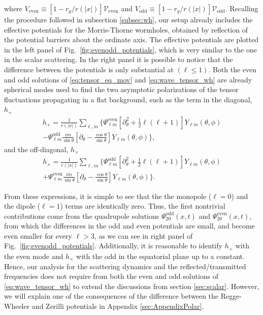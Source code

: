 \documentclass[article,aps,nofootinbib,twocolumn,superscriptaddress]{revtex4-1}
\begin{document}
where $V_{\mathrm{even}}\equiv[1-r_g/r(|x|)]\mathcal{V}_{\mathrm{even}}$ and $V_{\mathrm{odd}}\equiv[1-r_g/r(|x|)]\mathcal{V}_{\mathrm{odd}}$. Recalling the procedure followed in subsection \ref{subsec:wh}, our setup already includes the effective potentials for the Morris-Thorne wormholes, obtained by reflection of the potential barriers about the ordinate axis. The effective potentials are plotted in the left panel of Fig.~\ref{fig:evenodd_potentials}, which is very similar to the one in the scalar scattering. In the right panel it is possible to notice that the difference between the potentials is only substantial at $(\ell\leq1)$. Both the even and odd solutions of \eqref{eq:tensor_eq_mov} and \eqref{eq:wave_tensor_wh} are already spherical modes used to find the two asymptotic polarizations of the tensor fluctuations propagating in a flat background, such as the term in the diagonal, $h_+$ 
\begin{align}
\displaystyle{h_+=\frac{1}{r(|x|)}\sum_{\ell,m}\bigg\{\Psi_{\ell m}^{\mathrm{even}}\left[\partial^2_{\theta}+\frac{1}{2}\ell(\ell+1)\right]Y_{\ell m}(\theta,\phi)}\nonumber\\
\displaystyle{-\Psi_{\ell m}^{\mathrm{odd}}\frac{i m}{\sin\theta}\left[\partial_{\theta}-\frac{\cos\theta}{\sin\theta}\right]Y_{\ell m}(\theta,\phi)\bigg\}},
\label{eq:hplus}
\end{align} 
and the off-diagonal, $h_{\times}$ 
\begin{align}
\displaystyle{h_{\times}=\frac{1}{r(|x|)}\sum_{\ell,m}\bigg\{\Psi_{\ell m}^{\mathrm{odd}}\left[\partial^2_{\theta}+\frac{1}{2}\ell(\ell+1)\right]Y_{\ell m}(\theta,\phi)}\nonumber\\
\displaystyle{+\Psi_{\ell m}^{\mathrm{even}}\frac{i m}{\sin\theta}\left[\partial_{\theta}-\frac{\cos\theta}{\sin\theta}\right]Y_{\ell m}(\theta,\phi)\bigg\}}.
\label{eq:hx}
\end{align}


From these expressions, it is simple to see that the the monopole ($\ell=0$) and the dipole ($\ell=1$) terms are identically zero. Thus, the first nontrivial contributions come from the quadrupole solutions $\Psi_{20}^{\mathrm{odd}}(x,t)$ and $\Psi_{20}^{\mathrm{even}}(x,t)$, from which the differences in the odd and even potentials are small, and become even smaller for every $\ell>3$, as we can see in right panel of Fig.~\ref{fig:evenodd_potentials}. Additionally, it is reasonable to identify $h_+$ with the even mode and  $h_{\times}$ with the odd in the equatorial plane up to a constant. Hence, our analysis for the scattering dynamics and the reflected/transmitted frequencies does not require from both the even and odd solutions of \eqref{eq:wave_tensor_wh} to extend the discussions from section \ref{sec:scalar}. However, we will explain one of the consequences of the difference between the Regge-Wheeler and Zerilli potentials in Appendix \ref{sec:AppendixPolar}.
\end{document}
